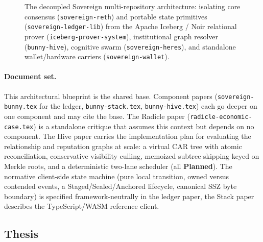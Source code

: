\documentclass[a4paper,11pt,twoside,parskip=half-,headings=small]{scrartcl}
\newcommand{\stPlan}{\textcolor{mute}{\textbf{Planned}}}
\newcommand{\code}[1]{\texttt{#1}}
\begin{document}
\begin{figure}[H]
{%
}
\caption{The decoupled Sovereign multi-repository architecture: isolating core consensus (\code{sovereign-reth}) and portable state primitives (\code{sovereign-ledger-lib}) from the Apache Iceberg / Noir relational prover (\code{iceberg-prover-system}), institutional graph resolver (\code{bunny-hive}), cognitive swarm (\code{sovereign-heres}), and standalone wallet/hardware carriers (\code{sovereign-wallet}).}
\label{fig:multi_repo_topology}
\end{figure}

\paragraph{Document set.}
This architectural blueprint is the shared base. Component papers (\code{sovereign-bunny.tex} for the ledger,
\code{bunny-stack.tex}, \code{bunny-hive.tex}) each go deeper on one component and may cite the base. The Radicle paper
(\code{radicle-economic-case.tex}) is a standalone critique that assumes this context but depends on no component. The Hive paper
carries the implementation plan for evaluating the relationship and reputation graphs at scale: a virtual CAR tree with atomic
reconciliation, conservative visibility culling, memoized subtree skipping keyed on Merkle roots, and a deterministic two-lane scheduler
(all \stPlan{}). The normative client-side state machine (pure local transition, owned versus contended events, a Staged/Sealed/Anchored lifecycle, canonical SSZ byte boundary) is specified framework-neutrally in the ledger paper, the Stack paper describes the TypeScript/WASM reference client.

\clearpage
\subsection{Thesis}
\end{document}
